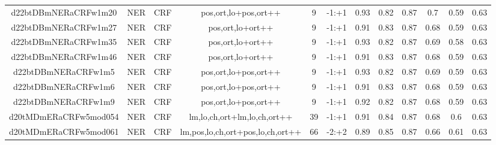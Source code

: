 \documentclass[a4paper]{article}
\begin{document}
\begin{landscape}
\begin{center}
\begin{tabular}{ |c|c|c|c|c|c|c|c|c|c|c|c|}
 
 	
 	\small{ d22btDBmNERaCRFw1m20 } & \small{ NER} & \small{  CRF }  & pos,ort,lo+pos,ort++  &  9 &  \small{  -1:+1 }  &  0.93 & 0.82 & 0.87  &  0.7 & 0.59 & 0.63 \\
 	

 
 	
 	\small{ d22btDBmNERaCRFw1m27 } & \small{ NER} & \small{  CRF }  & pos,ort,lo+ort++  &  9 &  \small{  -1:+1 }  &  0.91 & 0.83 & 0.87  &  0.68 & 0.59 & 0.63 \\
 	

 
 	
 	\small{ d22btDBmNERaCRFw1m35 } & \small{ NER} & \small{  CRF }  & pos,ort,lo+ort++  &  9 &  \small{  -1:+1 }  &  0.93 & 0.82 & 0.87  &  0.69 & 0.58 & 0.63 \\
 	

 
 	
 	\small{ d22btDBmNERaCRFw1m46 } & \small{ NER} & \small{  CRF }  & pos,ort,lo+ort++  &  9 &  \small{  -1:+1 }  &  0.91 & 0.83 & 0.87  &  0.68 & 0.59 & 0.63 \\
 	

 
 	
 	\small{ d22btDBmNERaCRFw1m5 } & \small{ NER} & \small{  CRF }  & pos,ort,lo+pos,ort++  &  9 &  \small{  -1:+1 }  &  0.93 & 0.82 & 0.87  &  0.69 & 0.59 & 0.63 \\
 	

 
 	
 	\small{ d22btDBmNERaCRFw1m6 } & \small{ NER} & \small{  CRF }  & pos,ort,lo+pos,ort++  &  9 &  \small{  -1:+1 }  &  0.91 & 0.83 & 0.87  &  0.68 & 0.59 & 0.63 \\
 	

 
 	
 	\small{ d22btDBmNERaCRFw1m9 } & \small{ NER} & \small{  CRF }  & pos,ort,lo+pos,ort++  &  9 &  \small{  -1:+1 }  &  0.92 & 0.82 & 0.87  &  0.68 & 0.59 & 0.63 \\
 	

 
 	
 	\small{ d20tMDmERaCRFw5mod054 } & \small{ NER} & \small{  CRF }  & lm,lo,ch,ort+lm,lo,ch,ort++  &  39 &  \small{  -1:+1 }  &  0.91 & 0.84 & 0.87  &  0.68 & 0.6 & 0.63 \\
 	

 
 	
 	\small{ d20tMDmERaCRFw5mod061 } & \small{ NER} & \small{  CRF }  & lm,pos,lo,ch,ort+pos,lo,ch,ort++  &  66 &  \small{  -2:+2 }  &  0.89 & 0.85 & 0.87  &  0.66 & 0.61 & 0.63 \\
 	


\end{tabular}
\end{center}
\end{landscape}
\end{document}

